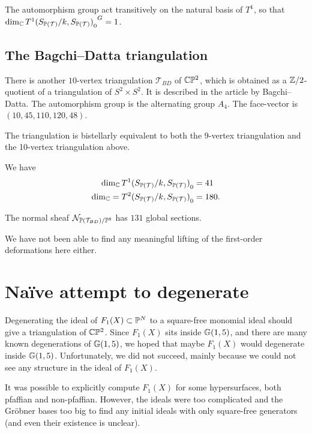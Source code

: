 The automorphism group act transitively on the natural basis of $T^1$, so that $\dim_\C {{T^1(S_{\P(\mathcal T)}/k, S_{\P(\mathcal T)})}_0}^G=1$. 

\subsection{The Bagchi--Datta triangulation}

There is another $10$-vertex triangulation $\mathcal T_{BD}$ of $\C \P^2$, which is obtained as a $\Z/2$-quotient of a triangulation of $S^2 \times S^2$. It is described in the article \cite{bagchi_datta} by Bagchi--Datta. The automorphism group is the alternating group $A_4$. The face-vector is $(10,45,110,120,48)$.

The triangulation is bistellarly equivalent to both the 9-vertex triangulation and the 10-vertex triangulation above.

\begin{proposition}
We have
\begin{align*}
\dim_\C  {T^1(S_{\P(\mathcal T)}/k, S_{\P(\mathcal T)})}_0 &= 41 \\
\dim_\C = {T^2(S_{\P(\mathcal T)}/k, S_{\P(\mathcal T)})}_0 &=180.
\end{align*}

The normal sheaf $\mathcal N_{\P(\mathcal T_{BD})/\P^{8}}$ has $131$ global sections.
\end{proposition}

We have not been able to find any meaningful lifting of the first-order deformations here either.

\section{Naïve attempt to degenerate}

Degenerating the ideal of $F_1(X) \subset \P^N$ to a square-free monomial ideal should give a triangulation of $\C \P^2$. Since $F_1(X)$ sits inside $\Gr(1,5)$, and there are many known degenerations of $\Gr(1,5)$, we hoped that maybe $F_1(X)$ would degenerate inside $\Gr(1,5)$. Unfortunately, we did not succeed, mainly because we could not see any structure in the ideal of $F_1(X)$.

It was possible to explicitly compute $F_1(X)$ for some hypersurfaces, both pfaffian and non-pfaffian. However, the ideals were too complicated and the Gröbner bases too big to find any initial ideals with only square-free generators (and even their existence is unclear).

